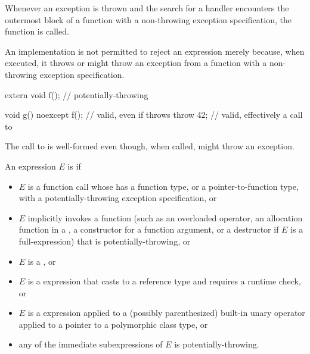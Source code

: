 \pnum
{}%
%
Whenever an exception is thrown
and the search for a handler
encounters the outermost block of a function with a
non-throwing exception specification,
the function  is called.
\begin{note}
An implementation is not permitted to reject an expression merely because, when
executed, it throws or might
throw an exception from a function with a non-throwing exception specification.
\end{note}
\begin{example}
\begin{codeblock}
extern void f();                // potentially-throwing

void g() noexcept {
  f();                          // valid, even if  throws
  throw 42;                     // valid, effectively a call to 
}
\end{codeblock}
The call to
is well-formed even though, when called,
might throw an exception.
\end{example}

\pnum
An expression $E$ is
 if
\begin{itemize}
\item
$E$ is a function call
whose 
has a function type,
or a pointer-to-function type,
with a potentially-throwing exception specification,
or
\item
$E$ implicitly invokes a function
(such as an overloaded operator,
an allocation function in a ,
a constructor for a function argument,
or a destructor if $E$ is a full-expression)
that is potentially-throwing,
or
\item
$E$ is a ,
or
\item
$E$ is a  expression that casts to a reference type and
requires a runtime check,
or
\item
$E$ is a  expression applied to a
(possibly parenthesized) built-in unary \tcode{*} operator
applied to a pointer to a
polymorphic class type,
or
\item
any of the immediate subexpressions
of $E$ is potentially-throwing.
\end{itemize}

